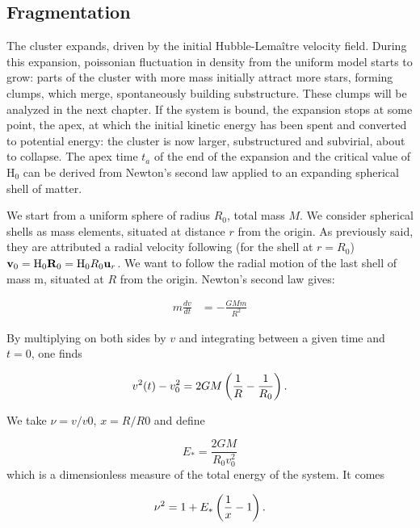 \subsection{Fragmentation}
\label{Sec:1_apextime}

The cluster expands, driven by the initial Hubble-Lema\^itre velocity field. During this expansion, poissonian fluctuation in density from the uniform model starts to grow: parts of the cluster with more mass initially attract more stars, forming clumps, which merge, spontaneously building substructure. These clumps will be analyzed in the next chapter. If the system is bound, the expansion stops at some point, the apex, at which the initial kinetic energy has been spent and converted to potential energy: the cluster is now larger, substructured and subvirial, about to collapse. The apex time $t_a$ of the end of the expansion and the critical value of H$_0$ can be derived from Newton's second law applied to an expanding spherical shell of matter.

We start from a uniform sphere of radius $R_0$, total mass $M$. We consider spherical shells as mass elements, situated at distance $r$ from the origin. As previously said, they are attributed a radial velocity following (for the shell at $r=R_0$) $\bold v_0 = {\textrm{H}}_0 \bold R_0 = {\textrm{H}}_0 R_0 \bold u_r$. We want to follow the radial motion of the last shell of mass m, situated at $R$ from the origin. Newton's second law gives:


\begin{align}\label{eq:newton}
m \frac{dv}{dt} & = - \frac{G M m}{R^2}
\end{align}

By multiplying on both sides by $v$ and integrating between a given time and $t=0$, one finds

\begin{equation}
v^2(t) - v^2_0 = 2GM \left( \frac{1}{R} - \frac{1}{R_0} \right).
\end{equation}

We take $\nu = v/v0$,  $x= R/R0$ and define

\begin{equation}
\label{Eq:1_Estar}
E_\ast = \frac{2GM}{R_0 v_0^2}
\end{equation}
which is a dimensionless measure of the total energy of the system. It comes

\begin{equation}
\nu^2  = 1 + E_\ast \left( \frac{1}{x} - 1 \right).
\end{equation}


